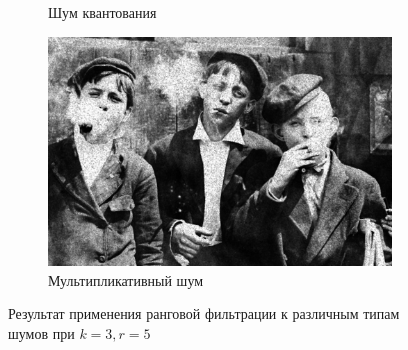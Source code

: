 \begin{figure}[ht]
\begin{subfigure}[b]{0.5\linewidth}
      \caption{Шум квантования} 
      \label{rang_3_5:e}
    \end{subfigure}%
    \begin{subfigure}[b]{0.5\linewidth}
        \centering
        \includegraphics[width=0.95\linewidth]{../Rang_Filter/Rang_Speckle_noise_(k=3,r=5).jpg} 
        \caption{Мультипликативный шум} 
        \label{rang_3_5:f} 
    \end{subfigure} 
    \caption{Результат применения ранговой фильтрации к различным типам шумов при $k = 3, r = 5$}
    \label{img:rang_3_5} 
\end{figure}

